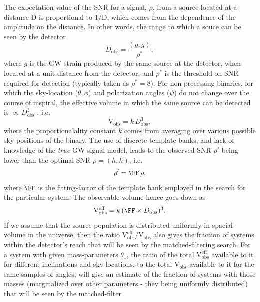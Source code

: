 The expectation value of the SNR for a signal, $\rho$, from a source located at
a distance $\mathrm{D}$ 
is proportional to $1/\mathrm{D}$, which comes from the dependence of the 
amplitude on the distance. In other words, the range to which a
souce can be seen by the detector
\begin{equation}
 D_{\mathrm{obs}} = \dfrac{(g,g)}{\rho^*},
\end{equation}
where $g$ is the GW strain produced by the same source at the detector, when 
located at a unit distance from the detector, and $\rho^*$ is the threshold on 
SNR required for
detection (typically taken as $\rho^* = 8$). For non-precessing binaries, for 
which the sky-location ($\theta,\phi$) and polarization angles ($\psi$) do not change over the course of
inspiral, the effective volume in which the same source can be detected is $\propto\,D_{\mathrm{obs}}^3$ \citep{Finn:1992xs}, i.e.
\begin{equation}
 \mathrm{V}_{\mathrm{obs}} = k\,D_{\mathrm{obs}}^3,
\end{equation}
where the proportionalality constant $k$ comes from averaging over various 
possible sky positions of the
binary. The use of discrete template banks, and lack of knowledge of the 
\textit{true} GW signal model, leads to the observed SNR $\rho'$ being lower 
than the optimal SNR $\rho = (h,h)$, i.e.
\begin{equation}
 \rho' = \FF \, \rho,
\end{equation}
where $\FF$ is the fitting-factor of the template bank employed in the search
for the particular system. The observable volume hence goes down as
\begin{equation}
 \mathrm{V}^{\mathrm{eff}}_{\mathrm{obs}} = k\, (\FF\times D_{\mathrm{obs}})^3.
\end{equation}
If we assume that the source population is distributed uniformly in spacial 
volume in the universe, then the ratio
$\mathrm{V}^{\mathrm{eff}}_{\mathrm{obs}}/\mathrm{V}_{\mathrm{obs}}$ also gives
the fraction of systems within the detector's reach that will be seen by the 
matched-filtering search. For a system with given mass-parameters $\theta_1$, the ratio of
the total $\mathrm{V}^{\mathrm{eff}}_{\mathrm{obs}}$ available to it
for different inclinations and sky-locations, to the total
$\mathrm{V}_{\mathrm{obs}}$ available to it for the same samples of angles, 
will give an estimate of the fraction of systems with those masses (marginalized over other
parameters - they being uniformly distributed) that will be seen by the matched-filter

